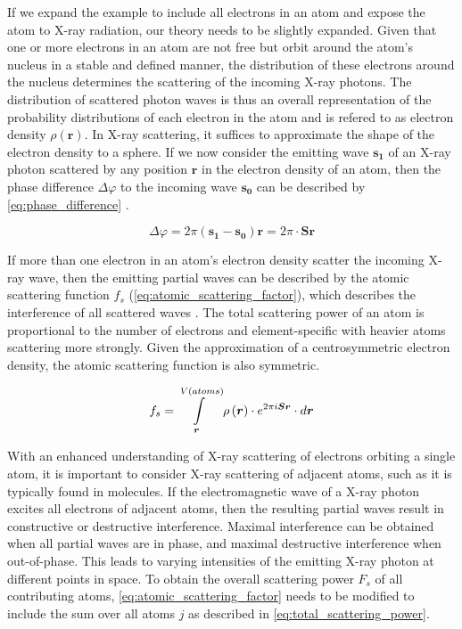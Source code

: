 If we expand the example to include all electrons in an atom and expose the atom to X-ray radiation, our theory needs to be slightly expanded. Given that one or more electrons in an atom are not free but orbit around the atom's nucleus in a stable and defined manner, the distribution of these electrons around the nucleus determines the scattering of the incoming X-ray photons. The distribution of scattered photon waves is thus an overall representation of the probability distributions of each electron in the atom and is refered to as electron density $\rho(\boldsymbol{r})$. In X-ray scattering, it suffices to approximate the shape of the electron density to a sphere. If we now consider the emitting wave $\boldsymbol{s_1}$ of an X-ray photon scattered by any position $\boldsymbol{r}$ in the electron density of an atom, then the phase difference $\Delta\varphi$ to the incoming wave $\boldsymbol{s_0}$ can be described by \cref{eq:phase_difference} \cite{Rupp2010-nc}.

\begin{equation}
    \Delta\varphi=2\pi\left(\boldsymbol{s_1}-\boldsymbol{s_0}\right)\boldsymbol{r}=2\pi \cdot \boldsymbol{S}\boldsymbol{r}
    \label{eq:phase_difference}
\end{equation}

If more than one electron in an atom's electron density scatter the incoming X-ray wave, then the emitting partial waves can be described by the atomic scattering function $f_s$ (\cref{eq:atomic_scattering_factor}), which describes the interference of all scattered waves \cite{Rupp2010-nc}. The total scattering power of an atom is proportional to the number of electrons and element-specific with heavier atoms scattering more strongly. Given the approximation of a centrosymmetric electron density, the atomic scattering function is also symmetric.

\begin{equation}
    f_s=\int\limits_{\boldsymbol{r}}^{V(atoms)}\rho\left(\boldsymbol{r}\right) \cdot e^{2\pi\\i\boldsymbol{S}\boldsymbol{r}} \cdot d\boldsymbol{r}
    \label{eq:atomic_scattering_factor}
\end{equation}

With an enhanced understanding of X-ray scattering of electrons orbiting a single atom, it is important to consider X-ray scattering of adjacent atoms, such as it is typically found in molecules. If the electromagnetic wave of a X-ray photon excites all electrons of adjacent atoms, then the resulting partial waves result in constructive or destructive interference. Maximal interference can be obtained when all partial waves are in phase, and maximal destructive interference when out-of-phase. This leads to varying intensities of the emitting X-ray photon at different points in space. To obtain the overall scattering power $F_s$ of all contributing atoms, \cref{eq:atomic_scattering_factor} needs to be modified to include the sum over all atoms $j$ as described in \cref{eq:total_scattering_power}.

